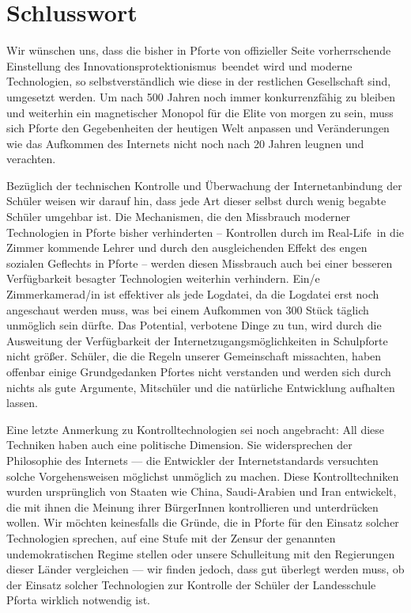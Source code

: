 \documentclass[10pt,a4paper,notitlepage]{scrartcl}
\newcommand{\gfo}{\grqq\ }
\newcommand{\gfu}{\glqq}
\begin{document}
\section{Schlusswort}
\begin{multicols}{2}
Wir wünschen uns, dass die bisher in Pforte von offizieller Seite vorherrschende Einstellung des \gfu Innovationsprotektionismus\gfo beendet wird und moderne Technologien, so selbstverständlich wie diese in der restlichen Gesellschaft sind, umgesetzt werden. Um nach 500 Jahren noch immer konkurrenzfähig zu bleiben und weiterhin ein magnetischer Monopol für die Elite von morgen zu sein, muss sich Pforte den Gegebenheiten der heutigen Welt anpassen und Veränderungen wie das Aufkommen des Internets nicht noch nach 20 Jahren leugnen und verachten.

Bezüglich der technischen Kontrolle und Überwachung der Internetanbindung der Schüler weisen wir darauf hin, dass jede Art dieser selbst durch wenig begabte Schüler umgehbar ist. Die Mechanismen, die den Missbrauch moderner Technologien in Pforte bisher verhinderten -- Kontrollen durch im \gfu Real-Life\gfo in die Zimmer kommende Lehrer und durch den ausgleichenden Effekt des engen sozialen Geflechts in Pforte -- werden diesen Missbrauch auch bei einer besseren Verfügbarkeit besagter Technologien weiterhin verhindern. Ein/e Zimmerkamerad/in ist effektiver als jede Logdatei, da die Logdatei erst noch angeschaut werden muss, was bei einem Aufkommen von 300 Stück täglich unmöglich sein dürfte. Das Potential, verbotene Dinge zu tun, wird durch die Ausweitung der Verfügbarkeit der Internetzugangsmöglichkeiten in Schulpforte nicht größer. Schüler, die die Regeln unserer Gemeinschaft missachten, haben offenbar einige Grundgedanken Pfortes nicht verstanden und werden sich durch nichts als gute Argumente, Mitschüler und die natürliche Entwicklung aufhalten lassen.

Eine letzte Anmerkung zu Kontrolltechnologien sei noch angebracht: All diese Techniken haben auch eine politische Dimension. Sie widersprechen der Philosophie des Internets --- die Entwickler der Internetstandards versuchten solche Vorgehensweisen möglichst unmöglich zu machen. Diese Kontrolltechniken wurden ursprünglich von Staaten wie China, Saudi-Arabien und Iran entwickelt, die mit ihnen die Meinung ihrer BürgerInnen kontrollieren und unterdrücken wollen. Wir möchten keinesfalls die Gründe, die in Pforte für den Einsatz solcher Technologien sprechen, auf eine Stufe mit der Zensur der genannten undemokratischen Regime stellen oder unsere Schulleitung mit den Regierungen dieser Länder vergleichen --- wir finden jedoch, dass gut überlegt werden muss, ob der Einsatz solcher Technologien zur Kontrolle der Schüler der Landesschule Pforta wirklich notwendig ist.
\end{multicols}
%
%
%
\end{document}
